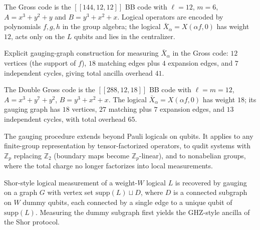 \begin{remark}
\label{rem:20_gross_code_definition}
\leanok
The Gross code is the $[[144,12,12]]$ BB code with $\ell = 12$, $m = 6$,
$A = x^3 + y^2 + y$ and $B = y^3 + x^2 + x$. Logical operators are encoded by polynomials
$f, g, h$ in the group algebra; the logical $\bar{X}_\alpha = X(\alpha f, 0)$ has weight
$12$, acts only on the $L$ qubits and lies in the centralizer.
\end{remark}

\begin{remark}
\label{rem:21_gross_code_gauging_measurement}
\leanok
Explicit gauging-graph construction for measuring $\bar{X}_\alpha$ in the Gross code: $12$
vertices (the support of $f$), $18$ matching edges plus $4$ expansion edges, and $7$
independent cycles, giving total ancilla overhead $41$.
\end{remark}

\begin{remark}
\label{rem:22_double_gross_code_definition}
\leanok
The Double Gross code is the $[[288, 12, 18]]$ BB code with $\ell = m = 12$,
$A = x^3 + y^7 + y^2$, $B = y^3 + x^2 + x$. The logical $\bar{X}_\alpha = X(\alpha f, 0)$ has
weight $18$; its gauging graph has $18$ vertices, $27$ matching plus $7$ expansion edges,
and $13$ independent cycles, with total overhead $65$.
\end{remark}

\begin{remark}
\label{rem:23_generalizations_beyond_pauli}
\leanok
The gauging procedure extends beyond Pauli logicals on qubits. It applies to any finite-group
representation by tensor-factorized operators, to qudit systems with $\mathbb{Z}_p$
replacing $\mathbb{Z}_2$ (boundary maps become $\mathbb{Z}_p$-linear), and to nonabelian
groups, where the total charge no longer factorizes into local measurements.
\end{remark}

\begin{remark}
\label{rem:24_shor_style_measurement}
\leanok
Shor-style logical measurement of a weight-$W$ logical $L$ is recovered by gauging on a
graph $G$ with vertex set $\mathrm{supp}(L) \sqcup D$, where $D$ is a connected subgraph on
$W$ dummy qubits, each connected by a single edge to a unique qubit of $\mathrm{supp}(L)$.
Measuring the dummy subgraph first yields the GHZ-style ancilla of the Shor protocol.
\end{remark}

